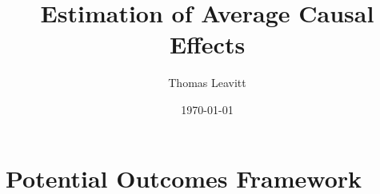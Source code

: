 \documentclass[table, xcolor = {dvipsnames}, 9pt]{beamer}
\title[]{Estimation of Average Causal Effects} %
\author{Thomas Leavitt} %
\institute[] %
{
\medskip
\textit{} %
}
\date{\today} %
\theoremstyle{plain}
\begin{document}
\begin{frame}
\titlepage %
\end{frame}


\section{Potential Outcomes Framework}
\end{document}
